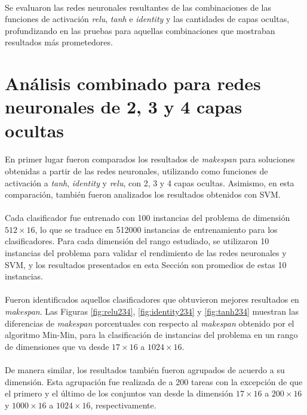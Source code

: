 \paragraph{} Se evaluaron las redes neuronales resultantes de las combinaciones de las funciones de activación \textit{relu}, \textit{tanh} e \textit{identity} y las cantidades de capas ocultas, profundizando en las pruebas para aquellas combinaciones que mostraban resultados más prometedores.

\section{Análisis combinado para redes neuronales de 2, 3 y 4 capas ocultas}

\paragraph{}En primer lugar fueron comparados los resultados de \textit{makespan} para soluciones obtenidas a partir de las redes neuronales, utilizando como funciones de activación a \textit{tanh}, \textit{identity} y \textit{relu}, con 2, 3 y 4 capas ocultas.
Asimismo, en esta comparación, también fueron analizados los resultados obtenidos con SVM. 

\paragraph{} Cada clasificador fue entrenado con 100 instancias del problema de dimensión $512\times16$, lo que se traduce en 512000 instancias de entrenamiento para los clasificadores. Para cada dimensión del rango estudiado, se utilizaron 10 instancias del problema para validar el rendimiento de las redes neuronales y SVM, y los resultados presentados en esta Sección son promedios de estas 10 instancias.

\paragraph{} Fueron identificados aquellos clasificadores que obtuvieron mejores resultados en \textit{makespan}.
Las Figuras \ref{fig:relu234}, \ref{fig:identity234} y \ref{fig:tanh234} muestran las diferencias de \textit{makespan} porcentuales con respecto al \textit{makespan} obtenido por el algoritmo Min-Min, para la clasificación de instancias del problema en un rango de dimensiones que va desde $17\times16$ a $1024\times16$.

\paragraph{} De manera similar, los resultados también fueron agrupados de acuerdo a su dimensión.
Esta agrupación fue realizada de a 200 tareas con la excepción de que el primero y el último de los conjuntos van desde la dimensión $17\times16$ a $200\times16$ y $1000\times16$ a $1024\times16$, respectivamente.


